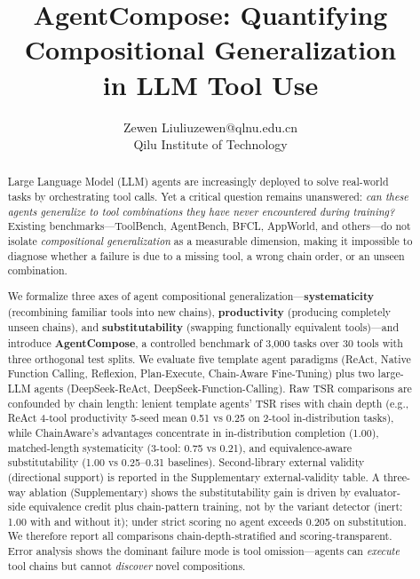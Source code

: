﻿\documentclass{article}
\title{AgentCompose: Quantifying Compositional Generalization \\ in LLM Tool Use}
\author{\name Zewen Liu\email liuzewen@qlnu.edu.cn\\\addr Qilu Institute of Technology}
\date{}
\begin{document}
\maketitle

\begin{abstract}
Large Language Model (LLM) agents are increasingly deployed to solve real-world tasks by orchestrating tool calls. Yet a critical question remains unanswered: \emph{can these agents generalize to tool combinations they have never encountered during training?} Existing benchmarks---ToolBench, AgentBench, BFCL, AppWorld, and others---do not isolate \emph{compositional generalization} as a measurable dimension, making it impossible to diagnose whether a failure is due to a missing tool, a wrong chain order, or an unseen combination.

We formalize three axes of agent compositional generalization---{\bf systematicity} (recombining familiar tools into new chains), {\bf productivity} (producing completely unseen chains), and {\bf substitutability} (swapping functionally equivalent tools)---and introduce {\bf AgentCompose}, a controlled benchmark of 3{,}000 tasks over 30 tools with three orthogonal test splits. We evaluate five template agent paradigms (ReAct, Native Function Calling, Reflexion, Plan-Execute, Chain-Aware Fine-Tuning) plus two large-LLM agents (DeepSeek-ReAct, DeepSeek-Function-Calling). Raw TSR comparisons are confounded by chain length: lenient template agents' TSR rises with chain depth (e.g., ReAct 4-tool productivity 5-seed mean 0.51 vs 0.25 on 2-tool in-distribution tasks), while ChainAware's advantages concentrate in in-distribution completion (1.00), matched-length systematicity (3-tool: 0.75 vs 0.21), and equivalence-aware substitutability (1.00 vs 0.25--0.31 baselines). Second-library external validity (directional support) is reported in the Supplementary external-validity table. A three-way ablation (Supplementary) shows the substitutability gain is driven by evaluator-side equivalence credit plus chain-pattern training, not by the variant detector (inert: 1.00 with and without it); under strict scoring no agent exceeds 0.205 on substitution. We therefore report all comparisons chain-depth-stratified and scoring-transparent. Error analysis shows the dominant failure mode is tool omission---agents can \emph{execute} tool chains but cannot \emph{discover} novel compositions.


\end{abstract}
\end{document}
